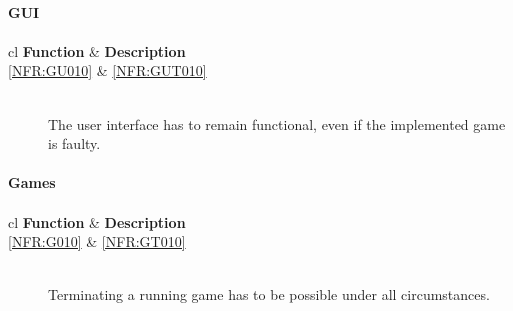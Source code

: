 
\paragraph{GUI}
\paragraph*{}
\begin{tabular}{{c}{l}}
    \hline
    \textbf{Function} & \textbf{Description} \\ \hline
	\ref{NFR:GU010} & \ref{NFR:GUT010} \\ \hline
\end{tabular}

\vspace{.5cm}

\begin{description}
  	\item[] \textbf{}  \\
	The user interface has to remain functional, even if the implemented game is faulty.
\end{description}


\begin{samepage}
\paragraph{Games}
\paragraph*{}
\begin{tabular}{{c}{l}}
    \hline
    \textbf{Function} & \textbf{Description} \\ \hline
	\ref{NFR:G010} & \ref{NFR:GT010} \\ \hline
\end{tabular}
\end{samepage}

\vspace{.5cm}

\begin{description}
	\item[] \textbf{}  \\
	Terminating a running game has to be possible under all circumstances. 
\end{description}


